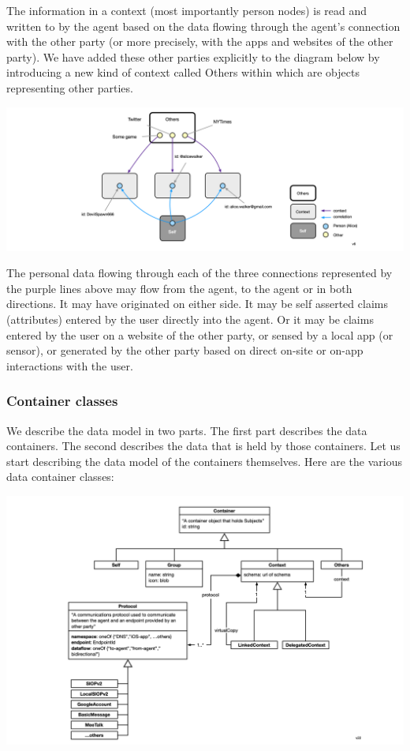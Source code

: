 \documentclass[11pt, oneside]{article}   	%
\begin{document}
The information in a context (most importantly person nodes) is read and written to by the agent based on the data flowing through the agent's connection with the other party (or more precisely, with the apps and websites of the other party). We have added these other parties explicitly to the diagram below by introducing a new kind of context called Others within which are objects representing other parties. 

\includegraphics[width=\textwidth]{./images/example2.png}

The personal data flowing through each of the three connections represented by the purple lines above may flow from the agent, to the agent or in both directions. It may have originated on either side. It may be self asserted claims (attributes) entered by the user directly into the agent. Or it may be claims entered by the user on a website of the other party, or sensed by a local app (or sensor), or generated by the other party based on direct on-site or on-app interactions with the user.

\subsubsection{Container classes}

We describe the data model in two parts. The first part describes the data containers. The second describes the data that is held by those containers. Let us start describing the data model of the containers themselves. Here are the various data container classes: 

\includegraphics[width=\textwidth]{./images/container-classes.png}
\end{document}
